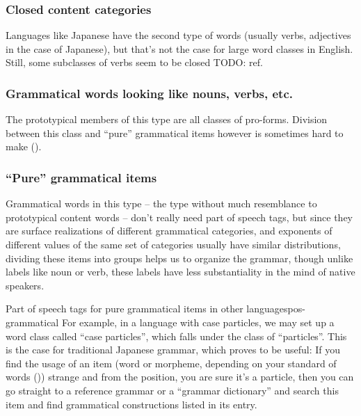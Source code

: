 \documentclass[UTF8, a4paper, oneside, scheme=plain]{ctexrep}
\begin{document}
\subsubsection{Closed content categories}

Languages like Japanese have the second type of words 
(usually verbs, adjectives in the case of Japanese),
but that's not the case for large word classes in English.
Still, some subclasses of verbs seem to be closed TODO: ref.

\subsubsection{Grammatical words looking like nouns, verbs, etc.}

The prototypical members of this type are all classes of pro-forms.
Division between this class and ``pure'' grammatical items however 
is sometimes hard to make (). %

\subsubsection{``Pure'' grammatical items}

Grammatical words in this type -- the type without much resemblance to prototypical content words -- 
don't really need part of speech tags,
but since they are surface realizations of different grammatical categories,
and exponents of different values of the same set of categories 
usually have similar distributions,
dividing these items into groups helps us to organize the grammar,
though unlike labels like noun or verb,
these labels have less substantiality in the mind of native speakers.

\begin{infobox}{Part of speech tags for pure grammatical items in other languages}{pos-grammatical}
    For example, in a language with case particles,
    we may set up a word class called ``case particles'',
    which falls under the class of ``particles''.
    This is the case for traditional Japanese grammar,
    which proves to be useful:
    If you find the usage of an item (word or morpheme, 
    depending on your standard of words ())
    strange and from the position,
    you are sure it's a particle,
    then you can go straight to a reference grammar or a ``grammar dictionary''
    and search this item and find grammatical constructions listed in its entry.
\end{infobox}
\end{document}
